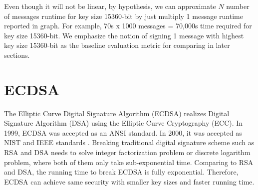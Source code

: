 \documentclass[10pt,sigconf]{acmart}
\begin{document}
Even though it will not be linear, by hypothesis, we can approximate $N$ number of messages runtime for key size 15360-bit by just multiply 1 message runtime reported in graph. For example, 70s x 1000 messages = 70,000s time required for key size 15360-bit. We emphasize the notion of signing 1 message with highest key size 15360-bit as the baseline evaluation metric for comparing in later sections.







\section{ECDSA}

The Elliptic Curve Digital Signature Algorithm (ECDSA) realizes Digital Signature Algorithm (DSA) using the Elliptic Curve Cryptography (ECC). In 1999, ECDSA was accepted as an ANSI standard. In 2000, it was accepted as NIST and IEEE standards \cite{johnson2001elliptic}. Breaking traditional digital signature scheme such as RSA and DSA needs to solve integer factorization problem or discrete logarithm problem, where both of them only take sub-exponential time. Comparing to RSA and DSA, the running time to break ECDSA is fully exponential. Therefore, ECDSA can achieve same security with smaller key sizes and faster running time.
\end{document}
